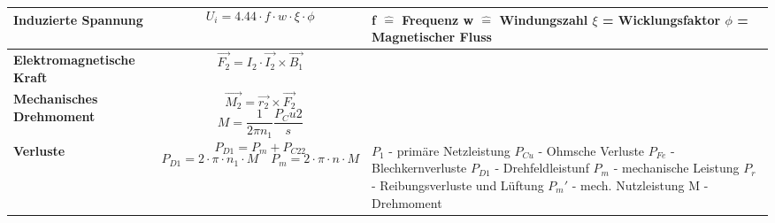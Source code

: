     \begin{tabular}[b]{|C{4cm}| P{8cm} | P{5cm}|}
    	\hline
    	\textbf{Induzierte Spannung} &
        \[ U_i = 4.44\cdot f\cdot w\cdot\xi\cdot\phi \] &
        f $\widehat{=}$ Frequenz \newline
        w $\widehat{=}$ Windungszahl \newline
        $\xi$ = Wicklungsfaktor \newline
        $\phi$ = Magnetischer Fluss
        \\ \hline
        
        \textbf{Elektromagnetische Kraft}	&
        \begin{equation*} \vec{F_2} = I_2\cdot\vec{I_2}\times\vec{B_1}\end{equation*} &
        \\ \hline
        
        \textbf{Mechanisches Drehmoment}	&
        \begin{equation*}\vec{M_2} = \vec{r_2}\times\vec{F_2}\end{equation*}
        \[ M = \frac{1}{2 \pi n_1}\frac{P_Cu2}{s} \]&
        \\ \hline
        
        \textbf{Verluste}\newline
        &
        \[ P_{D1}=P_m+P_{C22} \]
        \[ P_{D1}=2\cdot\pi\cdot n_1\cdot M \quad
         P_m = 2\cdot\pi\cdot n\cdot M \]&
         $ P_1 $ - primäre Netzleistung \newline
         $ P_{Cu} $ - Ohmsche Verluste \newline
         $ P_{Fe} $ - Blechkernverluste \newline
         $ P_{D1} $ - Drehfeldleistunf \newline
         $ P_m $ - mechanische Leistung \newline
         $ P_r $ - Reibungsverluste und Lüftung \newline
         $ P_m ' $ - mech. Nutzleistung \newline
         M - Drehmoment
        \\ \hline
    \end{tabular}
    \clearpage
